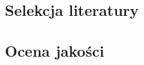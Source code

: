 \subsection{Selekcja literatury}\label{chapter:selekcja_literatury}

% 



\subsection{Ocena jakości}\label{chapter:ocena_jakosci}
